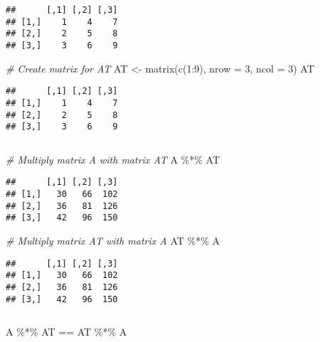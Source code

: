 \documentclass[
]{article}
\newenvironment{Shaded}{\begin{snugshade}}{\end{snugshade}}
\newcommand{\AttributeTok}[1]{\textcolor[rgb]{0.77,0.63,0.00}{#1}}
\newcommand{\CommentTok}[1]{\textcolor[rgb]{0.56,0.35,0.01}{\textit{#1}}}
\newcommand{\DecValTok}[1]{\textcolor[rgb]{0.00,0.00,0.81}{#1}}
\newcommand{\FunctionTok}[1]{\textcolor[rgb]{0.00,0.00,0.00}{#1}}
\newcommand{\NormalTok}[1]{#1}
\newcommand{\OtherTok}[1]{\textcolor[rgb]{0.56,0.35,0.01}{#1}}
\newcommand{\SpecialCharTok}[1]{\textcolor[rgb]{0.00,0.00,0.00}{#1}}
\begin{document}
\begin{verbatim}
##      [,1] [,2] [,3]
## [1,]    1    4    7
## [2,]    2    5    8
## [3,]    3    6    9
\end{verbatim}

\begin{Shaded}
\begin{Highlighting}[]
\CommentTok{\# Create matrix for AT}
\NormalTok{AT }\OtherTok{\textless{}{-}} \FunctionTok{matrix}\NormalTok{(}\FunctionTok{c}\NormalTok{(}\DecValTok{1}\SpecialCharTok{:}\DecValTok{9}\NormalTok{), }\AttributeTok{nrow =} \DecValTok{3}\NormalTok{, }\AttributeTok{ncol =} \DecValTok{3}\NormalTok{)}
\NormalTok{AT}
\end{Highlighting}
\end{Shaded}

\begin{verbatim}
##      [,1] [,2] [,3]
## [1,]    1    4    7
## [2,]    2    5    8
## [3,]    3    6    9
\end{verbatim}

\(~\)

\begin{Shaded}
\begin{Highlighting}[]
\CommentTok{\# Multiply matrix A with matrix AT}
\NormalTok{A }\SpecialCharTok{\%*\%}\NormalTok{ AT}
\end{Highlighting}
\end{Shaded}

\begin{verbatim}
##      [,1] [,2] [,3]
## [1,]   30   66  102
## [2,]   36   81  126
## [3,]   42   96  150
\end{verbatim}

\begin{Shaded}
\begin{Highlighting}[]
\CommentTok{\# Multiply matrix AT with matrix A}
\NormalTok{AT }\SpecialCharTok{\%*\%}\NormalTok{ A}
\end{Highlighting}
\end{Shaded}

\begin{verbatim}
##      [,1] [,2] [,3]
## [1,]   30   66  102
## [2,]   36   81  126
## [3,]   42   96  150
\end{verbatim}

\(~\)

\begin{Shaded}
\begin{Highlighting}[]
\NormalTok{A }\SpecialCharTok{\%*\%}\NormalTok{ AT }\SpecialCharTok{==}\NormalTok{ AT }\SpecialCharTok{\%*\%}\NormalTok{ A}
\end{Highlighting}
\end{Shaded}
\end{document}
